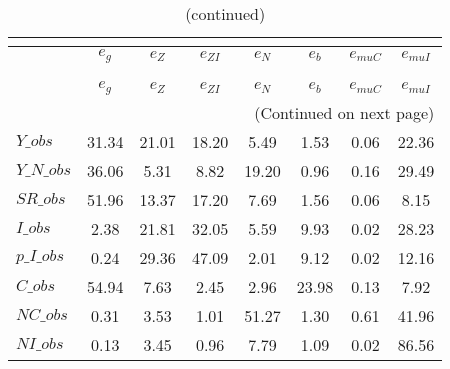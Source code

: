  
\begin{center}
\begin{longtable}{lccccccc} 
\caption{VARIANCE DECOMPOSITION (in percent)}\\
 \label{Table:th_var_decomp_uncond}\\
\toprule 
$               $	 & 	 $        {e_g}$	 & 	 $        {e_Z}$	 & 	 $     {e_{ZI}}$	 & 	 $        {e_N}$	 & 	 $        {e_b}$	 & 	 $    {e_{muC}}$	 & 	 $    {e_{muI}}$\\
\midrule \endfirsthead 
\caption{(continued)}\\
 \toprule \\ 
$               $	 & 	 $        {e_g}$	 & 	 $        {e_Z}$	 & 	 $     {e_{ZI}}$	 & 	 $        {e_N}$	 & 	 $        {e_b}$	 & 	 $    {e_{muC}}$	 & 	 $    {e_{muI}}$\\
\midrule \endhead 
\midrule \multicolumn{8}{r}{(Continued on next page)} \\ \bottomrule \endfoot 
\bottomrule \endlastfoot 
$Y\_obs         $	 & 	        31.34	 & 	        21.01	 & 	        18.20	 & 	         5.49	 & 	         1.53	 & 	         0.06	 & 	        22.36 \\ 
$Y\_N\_obs      $	 & 	        36.06	 & 	         5.31	 & 	         8.82	 & 	        19.20	 & 	         0.96	 & 	         0.16	 & 	        29.49 \\ 
$SR\_obs        $	 & 	        51.96	 & 	        13.37	 & 	        17.20	 & 	         7.69	 & 	         1.56	 & 	         0.06	 & 	         8.15 \\ 
$I\_obs         $	 & 	         2.38	 & 	        21.81	 & 	        32.05	 & 	         5.59	 & 	         9.93	 & 	         0.02	 & 	        28.23 \\ 
$p\_I\_obs      $	 & 	         0.24	 & 	        29.36	 & 	        47.09	 & 	         2.01	 & 	         9.12	 & 	         0.02	 & 	        12.16 \\ 
$C\_obs         $	 & 	        54.94	 & 	         7.63	 & 	         2.45	 & 	         2.96	 & 	        23.98	 & 	         0.13	 & 	         7.92 \\ 
$NC\_obs        $	 & 	         0.31	 & 	         3.53	 & 	         1.01	 & 	        51.27	 & 	         1.30	 & 	         0.61	 & 	        41.96 \\ 
$NI\_obs        $	 & 	         0.13	 & 	         3.45	 & 	         0.96	 & 	         7.79	 & 	         1.09	 & 	         0.02	 & 	        86.56 \\ 

\end{longtable}
\end{center}
